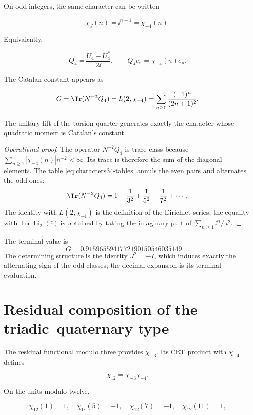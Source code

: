 On odd integers, the same character can be written

\[
\chi_J(n)=\ii^{n-1}=\chi_{-4}(n).
\]

Equivalently,

\begin{equation}
Q_4=\frac{U_4-U_4^*}{2\ii},
\qquad Q_4e_n=\chi_{-4}(n)e_n.
\label{eq:Q4}
\end{equation}

The Catalan constant appears as

\begin{equation}
G=\Tr(N^{-2}Q_4)=L(2,\chi_{-4})
=\sum_{n\ge0}\frac{(-1)^n}{(2n+1)^2}.
\label{eq:catalan}
\end{equation}

The unitary lift of the torsion quarter generates exactly the
character whose quadratic moment is Catalan's constant.

\begin{proof}[Operational proof]
The operator \(N^{-2}Q_4\) is trace-class because
\(\sum_{n\ge1}|\chi_{-4}(n)|n^{-2}<\infty\). Its trace is therefore the
sum of the diagonal elements. The table \cref{eq:characters34-tables}
annuls the even pairs and alternates the odd ones:
\[
\Tr(N^{-2}Q_4)
=1-\frac1{3^2}+\frac1{5^2}-\frac1{7^2}+\cdots.
\]
The identity with \(L(2,\chi_{-4})\) is the definition of the
Dirichlet series; the equality with \(\operatorname{Im}\operatorname{Li}_2(\ii)\)
is obtained by taking the imaginary part of
\(\sum_{n\ge1}\ii^n/n^2\).
\end{proof}

The terminal value is
\[
G=0.9159655941772190150546035149\ldots.
\]
The determining structure is the identity \(J^2=-I\), which induces
exactly the alternating sign of the odd classes; the decimal
expansion is its terminal evaluation.

\section{Residual composition of the triadic--quaternary type}

The residual functional modulo three provides \(\chi_{-3}\). Its CRT
product with \(\chi_{-4}\) defines

\begin{equation}
\chi_{12}=\chi_{-3}\chi_{-4}.
\label{eq:chi12}
\end{equation}

On the units modulo twelve,

\[
\chi_{12}(1)=1,\quad
\chi_{12}(5)=-1,\quad
\chi_{12}(7)=-1,\quad
\chi_{12}(11)=1,
\]

